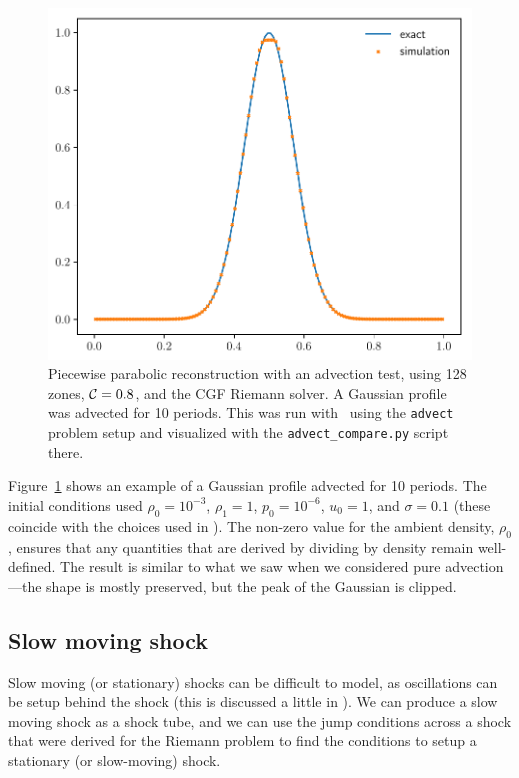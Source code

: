 \begin{figure}[t]
\centering
\includegraphics[width=0.7\linewidth]{advect_hydro1d}
\caption[Simple advection test]{\label{fig:Euler:advect:1d} Piecewise
  parabolic reconstruction with an advection test, using 128 zones,
  ${\mathcal{C}} = 0.8$, and the CGF Riemann solver.  A Gaussian profile was
  advected for 10 periods.  This was run with \hydrooned\ using the
  {\tt advect} problem setup and
  visualized with the {\tt advect\_compare.py} script there.}
\end{figure}

Figure~\ref{fig:Euler:advect:1d} shows an example of a Gaussian
profile advected for 10 periods.  The initial conditions used $\rho_0
= 10^{-3}$, $\rho_1 = 1$, $p_0 = 10^{-6}$, $u_0 = 1$, and $\sigma =
0.1$ (these coincide with the choices used in \cite{flash}).  The
non-zero value for the ambient density, $\rho_0$, ensures that any
quantities that are derived by dividing by density remain
well-defined.  The result is similar to what we saw when we considered
pure advection---the shape is mostly preserved, but the peak of the
Gaussian is clipped.

\subsection{Slow moving shock}

Slow moving (or stationary) shocks can be difficult to model, as
oscillations can be setup behind the shock (this is discussed a little
in \cite{colellawoodward:1984,leveque:2002}).  We can produce a slow
moving shock as a shock tube, and we can use the jump conditions 
across a shock that were derived for the Riemann problem to find the
conditions to setup a stationary (or slow-moving) shock.  

